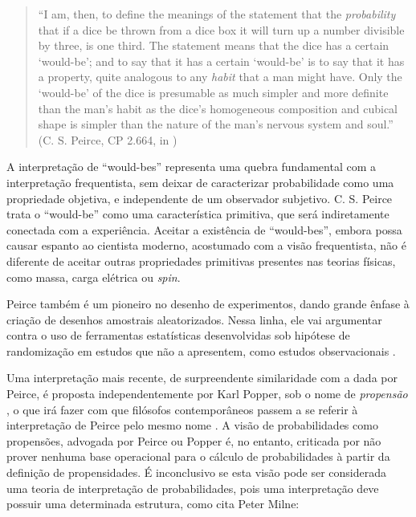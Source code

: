 \begin{quote}
``I am, then, to define the meanings of the statement that the {\em probability} that if a dice be thrown from a dice
box it will turn up a number divisible by three, is one third. The statement means that the dice has a certain `would-be';
and to say that it has a certain `would-be' is to say that it has a property, quite analogous to any {\em habit} that a man
might have. Only the `would-be' of the dice is presumable as much simpler and more definite than the man's habit as the
dice's homogeneous composition and cubical shape is simpler than the nature of the man's nervous system and soul.''
(C. S. Peirce, CP 2.664, in \citep{Fetzer93})
\end{quote}

A interpretação de ``would-bes'' representa uma quebra fundamental com a interpretação frequentista, sem deixar de caracterizar
probabilidade como uma propriedade objetiva, e independente de um observador subjetivo. C. S. Peirce trata o ``would-be'' como
uma característica primitiva, que será indiretamente conectada com a experiência. Aceitar a existência de ``would-bes'', 
embora possa causar espanto ao cientista moderno, acostumado com a visão 
frequentista, não é diferente de aceitar outras propriedades
primitivas presentes nas teorias físicas, como massa, carga elétrica
ou {\em spin}.

Peirce também é um pioneiro no desenho de experimentos, dando grande ênfase à criação de desenhos amostrais aleatorizados.
Nessa linha, ele vai argumentar contra o uso de ferramentas estatísticas desenvolvidas sob
hipótese de randomização em estudos que não a apresentem, como estudos observacionais \citep{Stigler78}.

Uma interpretação mais recente, de surpreendente similaridade com a dada por Peirce, é proposta independentemente por Karl Popper, sob o nome
de {\em propensão} \citep{Popper59}, o que irá fazer com que filósofos contemporâneos passem a se referir à interpretação de Peirce pelo mesmo
nome \citep{Miller75}.
A visão de probabilidades como propensões, advogada por Peirce ou Popper é, 
no entanto, criticada por não prover nenhuma base operacional para o cálculo de probabilidades à partir
da definição de propensidades\citep{Hajek12}. 
É inconclusivo se esta visão pode ser considerada uma teoria de interpretação
de probabilidades, pois uma interpretação deve possuir uma determinada estrutura, como cita Peter Milne:

